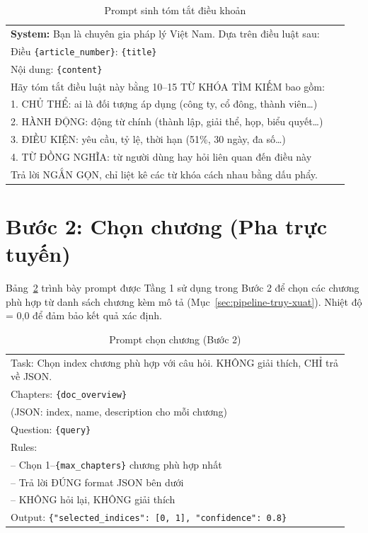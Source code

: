 \begin{table}[htbp]
  \centering
  \caption{Prompt sinh tóm tắt điều khoản}
  \label{tab:prompt-article-summary}
  \begin{tabular}{p{0.95\linewidth}}
    \toprule
    \textbf{System:} Bạn là chuyên gia pháp lý Việt Nam. Dựa trên điều luật sau: \\[6pt]
    Điều \texttt{\{article\_number\}}: \texttt{\{title\}} \\
    Nội dung: \texttt{\{content\}} \\[6pt]
    Hãy tóm tắt điều luật này bằng 10--15 TỪ KHÓA TÌM KIẾM bao gồm: \\
    1. CHỦ THỂ: ai là đối tượng áp dụng (công ty, cổ đông, thành viên\ldots) \\
    2. HÀNH ĐỘNG: động từ chính (thành lập, giải thể, họp, biểu quyết\ldots) \\
    3. ĐIỀU KIỆN: yêu cầu, tỷ lệ, thời hạn (51\%, 30 ngày, đa số\ldots) \\
    4. TỪ ĐỒNG NGHĨA: từ người dùng hay hỏi liên quan đến điều này \\[6pt]
    Trả lời NGẮN GỌN, chỉ liệt kê các từ khóa cách nhau bằng dấu phẩy. \\
    \bottomrule
  \end{tabular}
\end{table}

\section{Bước 2: Chọn chương (Pha trực tuyến)}
\label{sec:app-prompt-loop1}

Bảng~\ref{tab:prompt-loop1} trình bày prompt được Tầng 1 sử dụng trong Bước 2 để chọn các chương phù hợp từ danh
sách chương kèm mô tả (Mục~\ref{sec:pipeline-truy-xuat}). Nhiệt độ = 0,0 để đảm bảo kết quả xác định.

\begin{table}[htbp]
  \centering
  \caption{Prompt chọn chương (Bước 2)}
  \label{tab:prompt-loop1}
  \begin{tabular}{p{0.95\linewidth}}
    \toprule
    Task: Chọn index chương phù hợp với câu hỏi. KHÔNG giải thích, CHỈ trả về JSON. \\[6pt]
    Chapters: \texttt{\{doc\_overview\}} \\
    (JSON: index, name, description cho mỗi chương) \\[6pt]
    Question: \texttt{\{query\}} \\[6pt]
    Rules: \\
    -- Chọn 1--\texttt{\{max\_chapters\}} chương phù hợp nhất \\
    -- Trả lời ĐÚNG format JSON bên dưới \\
    -- KHÔNG hỏi lại, KHÔNG giải thích \\[6pt]
    Output: \texttt{\{"selected\_indices": [0, 1], "confidence": 0.8\}} \\
    \bottomrule
  \end{tabular}
\end{table}

